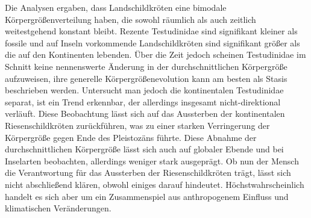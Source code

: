 Die Analysen ergaben, dass Landschildkröten eine bimodale Körpergrößenverteilung haben, die sowohl räumlich als auch zeitlich weitestgehend konstant bleibt. Rezente Testudinidae sind signifikant kleiner als fossile und auf Inseln vorkommende
Landschildkröten sind signifikant größer als die auf den Kontinenten lebenden.
Über die Zeit jedoch scheinen Testudinidae im Schnitt keine nennenswerte Änderung in der durchschnittlichen Körpergröße aufzuweisen, ihre generelle Körpergrößenevolution kann am besten als Stasis beschrieben werden.
Untersucht man jedoch die kontinentalen Testudinidae separat, ist ein Trend erkennbar, der allerdings insgesamt nicht-direktional verläuft. Diese Beobachtung lässt sich auf das Aussterben der kontinentalen Riesenschildkröten zurückführen, was zu einer starken Verringerung der Körpergröße gegen Ende des Pleistozäns führte.
Diese Abnahme der durchschnittlichen Körpergröße lässt sich auch auf globaler Ebende und bei Inselarten beobachten, allerdings weniger stark ausgeprägt.
Ob nun der Mensch die Verantwortung für das Aussterben der Riesenschildkröten trägt, lässt sich nicht abschließend klären, obwohl einiges darauf hindeutet. Höchstwahrscheinlich handelt es sich aber um ein Zusammenspiel aus anthropogenem Einfluss und klimatischen Veränderungen.



